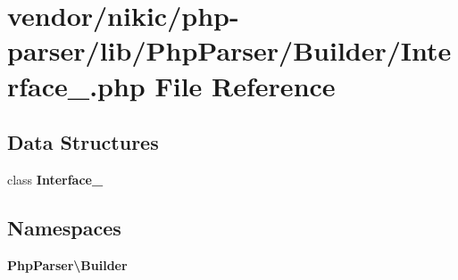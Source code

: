 \section{vendor/nikic/php-\/parser/lib/\+Php\+Parser/\+Builder/\+Interface\+\_\+.php File Reference}
\label{_builder_2_interface___8php}
\subsection*{Data Structures}
\begin{DoxyCompactItemize}
\item 
class {\bf Interface\+\_\+}
\end{DoxyCompactItemize}
\subsection*{Namespaces}
\begin{DoxyCompactItemize}
\item 
 {\bf Php\+Parser\textbackslash{}\+Builder}
\end{DoxyCompactItemize}
